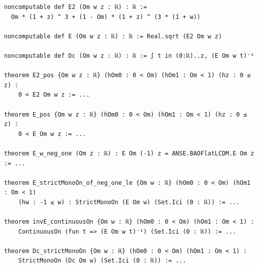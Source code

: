 \begin{lstlisting}
noncomputable def E2 (Om w z : ℝ) : ℝ :=
  Om * (1 + z) ^ 3 + (1 - Om) * (1 + z) ^ (3 * (1 + w))

noncomputable def E (Om w z : ℝ) : ℝ := Real.sqrt (E2 Om w z)

noncomputable def Dc (Om w z : ℝ) : ℝ := ∫ t in (0:ℝ)..z, (E Om w t)⁻¹

theorem E2_pos {Om w z : ℝ} (hOm0 : 0 < Om) (hOm1 : Om < 1) (hz : 0 ≤ z) :
    0 < E2 Om w z := ...

theorem E_pos {Om w z : ℝ} (hOm0 : 0 < Om) (hOm1 : Om < 1) (hz : 0 ≤ z) :
    0 < E Om w z := ...

theorem E_w_neg_one (Om z : ℝ) : E Om (-1) z = ANSE.BAOFlatLCDM.E Om z := ...

theorem E_strictMonoOn_of_neg_one_le {Om w : ℝ} (hOm0 : 0 < Om) (hOm1 : Om < 1)
    (hw : -1 ≤ w) : StrictMonoOn (E Om w) (Set.Ici (0 : ℝ)) := ...

theorem invE_continuousOn {Om w : ℝ} (hOm0 : 0 < Om) (hOm1 : Om < 1) :
    ContinuousOn (fun t => (E Om w t)⁻¹) (Set.Ici (0 : ℝ)) := ...

theorem Dc_strictMonoOn {Om w : ℝ} (hOm0 : 0 < Om) (hOm1 : Om < 1) :
    StrictMonoOn (Dc Om w) (Set.Ici (0 : ℝ)) := ...
\end{lstlisting}
